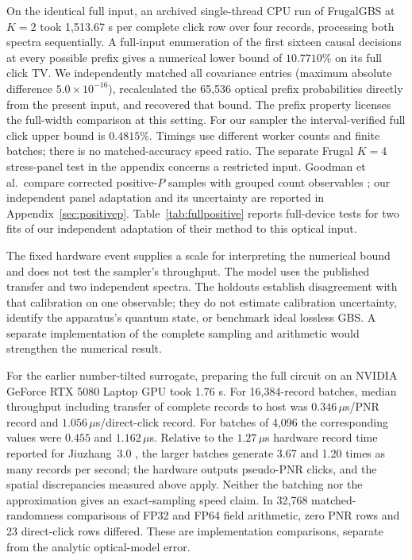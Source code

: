 \documentclass[11pt]{article}
\begin{document}
On the identical full input, an archived single-thread CPU run of FrugalGBS at $K=2$ took 1,513.67 s per complete click row over four records, processing both spectra sequentially. A full-input enumeration of the first sixteen causal decisions at every possible prefix gives a numerical lower bound of $10.7710\%$ on its full click TV. We independently matched all covariance entries (maximum absolute difference $5.0\times 10^{-16}$), recalculated the 65,536 optical prefix probabilities directly from the present input, and recovered that bound. The prefix property licenses the full-width comparison at this setting. For our sampler the interval-verified full click upper bound is $0.4815\%$. Timings use different worker counts and finite batches; there is no matched-accuracy speed ratio. The separate Frugal $K=4$ stress-panel test in the appendix concerns a restricted input. Goodman et al.\ compare corrected positive-$P$ samples with grouped count observables \cite{goodman}; our independent panel adaptation and its uncertainty are reported in Appendix~\ref{sec:positivep}. Table~\ref{tab:fullpositive} reports full-device tests for two fits of our independent adaptation of their method to this optical input.

The fixed hardware event supplies a scale for interpreting the numerical bound and does not test the sampler's throughput. The model uses the published transfer and two independent spectra. The holdouts establish disagreement with that calibration on one observable; they do not estimate calibration uncertainty, identify the apparatus's quantum state, or benchmark ideal lossless GBS. A separate implementation of the complete sampling and arithmetic would strengthen the numerical result.

For the earlier number-tilted surrogate, preparing the full circuit on an NVIDIA GeForce RTX 5080 Laptop GPU took 1.76 s. For 16,384-record batches, median throughput including transfer of complete records to host was $0.346\,\mu$s/PNR record and $1.056\,\mu$s/direct-click record. For batches of 4,096 the corresponding values were $0.455$ and $1.162\,\mu$s. Relative to the $1.27\,\mu$s hardware record time reported for Jiuzhang~3.0 \cite{jiuzhang}, the larger batches generate 3.67 and 1.20 times as many records per second; the hardware outputs pseudo-PNR clicks, and the spatial discrepancies measured above apply. Neither the batching nor the approximation gives an exact-sampling speed claim. In 32,768 matched-randomness comparisons of FP32 and FP64 field arithmetic, zero PNR rows and 23 direct-click rows differed. These are implementation comparisons, separate from the analytic optical-model error.
\end{document}
